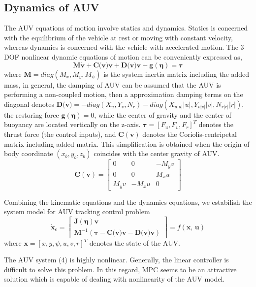 \documentclass[journal,11pt,draftcls,onecolumn]{IEEEtran}
\begin{document}
\subsection{Dynamics of AUV}
The AUV equations of motion involve statics and dynamics. Statics is concerned with the equilibrium of the vehicle at rest or moving with constant velocity, whereas dynamics is concerned with the vehicle with accelerated motion. The 3 DOF nonlinear dynamic equations of motion can be conveniently expressed as,
\begin{equation}
  \textbf{M}\dot{\textbf{v}}+\textbf{C(v)v}+\textbf{D(v)v}+\textbf{g}(\bm{\eta})=\bm{\tau}
\end{equation}
where $\textbf{M}=diag(M_x,M_y,M_{\psi})$ is the system inertia matrix including the added mass, in general, the damping of AUV can be assumed that the AUV is performing a non-coupled motion, then a approximation damping terms on the diagonal denotes $\textbf{D(v)}=-diag(X_u,Y_v,N_r)-diag(X_{u|u|}|u|,Y_{v|v|}|v|,N_{r|r|}|r|)$, the restoring force $\textbf{g}(\bm{\eta})=0$, while the center of gravity and the center of buoyancy are located vertically on the z-axis.  $\bm{\tau}=[F_u,F_v,F_r]^T$ denotes the thrust force (the control inputs), and $\textbf{C}(\textbf{v})$ denotes the Coriolis-centripetal matrix including added matrix. This simplification is obtained when the origin of body coordinate $(x_b, y_b, z_b)$ coincides with the center gravity of AUV. $$\textbf{C}(\textbf{v})=\begin{bmatrix}0 &0 &-M_yv\\0 &0 &M_xu\\M_yv &-M_xu &0\end{bmatrix}$$

Combining the kinematic equations and the dynamics equations, we estabilish the system model for AUV tracking control problem
\begin{equation}
\dot{\textbf{x}}_e=\begin{bmatrix}
\textbf{J}(\bm{\eta})\textbf{v}\\
\textbf{M}^{-1}(\bm{\tau}-\textbf{C(v)v}-\textbf{D(v)v})
\end{bmatrix}
=f(\textbf{x, u})
\end{equation}
where $\textbf{x}=[x,y,\psi,u,v,r]^T$ denotes the state of the AUV.%

The AUV system (4) is highly nonlinear. Generally, the linear controller is difficult to solve this problem. In this regard, MPC seems to be an attractive solution which is capable of dealing with nonlinearity of the AUV model.
\end{document}
